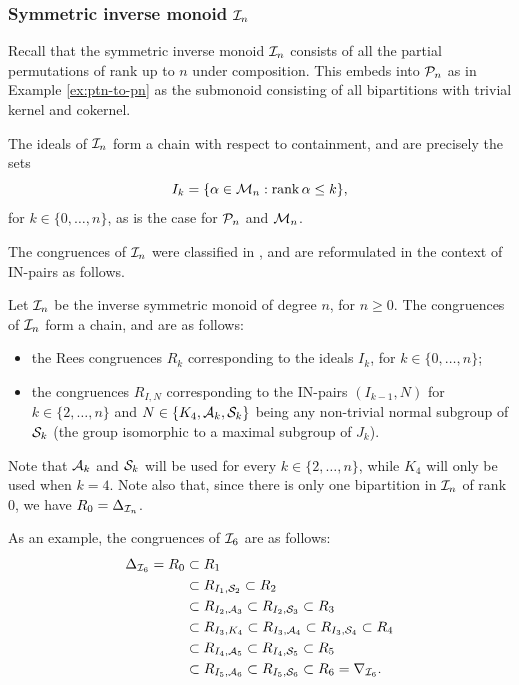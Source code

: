\subsubsection{Symmetric inverse monoid $\mathcal{I}_n$}
Recall that the symmetric inverse monoid $\mathcal{I}_n$ consists of all the partial
permutations of rank up to $n$ under composition.  This embeds into $\mathcal{P}_n$ as
in Example \ref{ex:ptn-to-pn} as the submonoid consisting of all bipartitions
with trivial kernel and cokernel.

The ideals of $\mathcal{I}_n$ form a chain with respect to containment, and are precisely
the sets $$I_k=\{\alpha \in \mathcal{M}_n : \operatorname{rank} \alpha \leq k\},$$ for
$k \in \{0, \ldots, n\}$, as is the case for $\mathcal{P}_n$ and $\mathcal{M}_n$.

The congruences of $\mathcal{I}_n$ were classified in \cite{liber_1953}, and are
reformulated in the context of IN-pairs as follows.
\begin{theorem}
  \label{thm:in-congs}
  Let $\mathcal{I}_n$ be the inverse symmetric monoid of degree $n$, for $n \geq 0$.  The
  congruences of $\mathcal{I}_n$ form a chain, and are as follows:
  \begin{itemize}
  \item the Rees congruences $R_k$ corresponding to the ideals $I_k$, for
    $k \in \{0, \ldots, n\}$;
  \item the congruences $R_{I,N}$ corresponding to the IN-pairs $(I_{k-1}, N)$
    for $k \in \{2, \ldots, n\}$ and $N \in \{K_4, \mathcal{A}_k, \mathcal{S}_k\}$ being any
    non-trivial normal subgroup of $\mathcal{S}_k$ (the group isomorphic to a maximal
    subgroup of $J_k$).
  \end{itemize}
\end{theorem}
Note that $\mathcal{A}_k$ and $\mathcal{S}_k$ will be used for every $k \in \{2, \ldots, n\}$,
while $K_4$ will only be used when $k=4$.  Note also that, since there is only
one bipartition in $\mathcal{I}_n$ of rank $0$, we have $R_0 = \Delta_{\mathcal{I}_n}$.

As an example, the congruences of $\mathcal{I}_6$ are as follows:
\begin{align*}
  \Delta_{\mathcal{I}_6} = R_0 & \subset R_1 \\
      & \subset R_{I_1,\mathcal{S}_2} \subset R_2 \\
      & \subset R_{I_2,\mathcal{A}_3} \subset R_{I_2, \mathcal{S}_3} \subset R_3 \\
      & \subset R_{I_3,K_4} \subset R_{I_3,\mathcal{A}_4} \subset R_{I_3, \mathcal{S}_4} \subset R_4 \\
      & \subset R_{I_4,\mathcal{A}_5} \subset R_{I_4, \mathcal{S}_5} \subset R_5 \\
      & \subset R_{I_5,\mathcal{A}_6} \subset R_{I_5, \mathcal{S}_6} \subset R_6 = \nabla_{\mathcal{I}_6}.
\end{align*}

